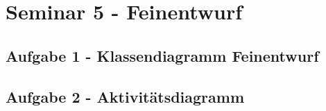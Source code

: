 
\section{Seminar 5 - Feinentwurf}

	\subsection{Aufgabe 1 - Klassendiagramm Feinentwurf}
	
	\subsection{Aufgabe 2 - Aktivitätsdiagramm}
	
